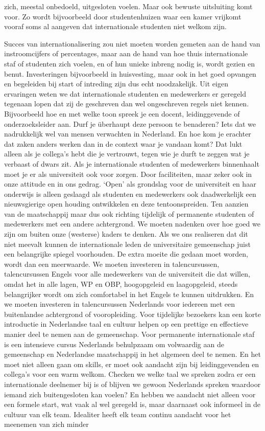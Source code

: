 \documentclass[empirical, authordate, ]{new-jote-article}
\begin{document}
zich, meestal onbedoeld, uitgesloten voelen. Maar ook bewuste uitsluiting komt voor. Zo wordt bijvoorbeeld door studentenhuizen waar een kamer vrijkomt vooraf soms al aangeven dat internationale studenten niet welkom zijn.



	Succes van internationalisering zou niet moeten worden gemeten aan de hand van instroomcijfers of percentages, maar aan de hand van hoe thuis internationale staf of studenten zich voelen, en of hun unieke inbreng nodig is, wordt gezien en benut. Investeringen bijvoorbeeld in huisvesting, maar ook in het goed opvangen en begeleiden bij start of intreding zijn dus echt noodzakelijk. Uit eigen ervaringen weten we dat internationale studenten en medewerkers er geregeld tegenaan lopen dat zij de geschreven dan wel ongeschreven regels niet kennen. Bijvoorbeeld hoe en met welke toon spreek je een docent, leidinggevende of onderzoeksleider aan. Durf je überhaupt deze persoon te benaderen? Iets dat we nadrukkelijk wel van mensen verwachten in Nederland. En hoe kom je erachter dat zaken anders werken dan in de context waar je vandaan komt? Dat lukt alleen als je collega's hebt die je vertrouwt, tegen wie je durft te zeggen wat je verbaast of dwars zit. Als je internationale studenten of medewerkers binnenhaalt moet je er als universiteit ook voor zorgen. Door faciliteiten, maar zeker ook in onze attitude en in ons gedrag. ‘Open' als grondslag voor de universiteit en haar onderwijs is alleen geslaagd als studenten en medewerkers ook daadwerkelijk een nieuwsgierige open houding ontwikkelen en deze tentoonspreiden. Ten aanzien van de maatschappij maar dus ook richting tijdelijk of permanente studenten of medewerkers met een andere achtergrond. We moeten nadenken over hoe goed we zijn om buiten onze (westerse) kaders te denken. Als we ons realiseren dat dit niet meevalt kunnen de internationale leden de universitaire gemeenschap juist een belangrijke spiegel voorhouden. De extra moeite die gedaan moet worden, wordt dan een meerwaarde. We moeten investeren in talencursussen, talencursussen Engels voor alle medewerkers van de universiteit die dat willen, omdat het in alle lagen, WP en OBP, hoogopgeleid en laagopgeleid, steeds belangrijker wordt om zich comfortabel in het Engels te kunnen uitdrukken. En we moeten investeren in talencursussen Nederlands voor iedereen met een buitenlandse achtergrond of vooropleiding. Voor tijdelijke bezoekers kan een korte introductie in Nederlandse taal en cultuur helpen op een prettige en effectieve manier deel te nemen aan de gemeenschap. Voor permanente internationale staf is een intensieve cursus Nederlands behulpzaam om volwaardig aan de gemeenschap en Nederlandse maatschappij in het algemeen deel te nemen. En het moet niet alleen gaan om skills, er moet ook aandacht zijn bij leidinggevenden en collega's voor een warm welkom. Checken we welke taal we spreken zodra er een internationale deelnemer bij is of blijven we gewoon Nederlands spreken waardoor iemand zich buitengesloten kan voelen? En hebben we aandacht niet alleen voor een formele start, wat vaak al wel geregeld is, maar daarnaast ook informeel in de cultuur van elk team. Idealiter heeft elk team continu aandacht voor het meenemen van zich minder 
\end{document}
